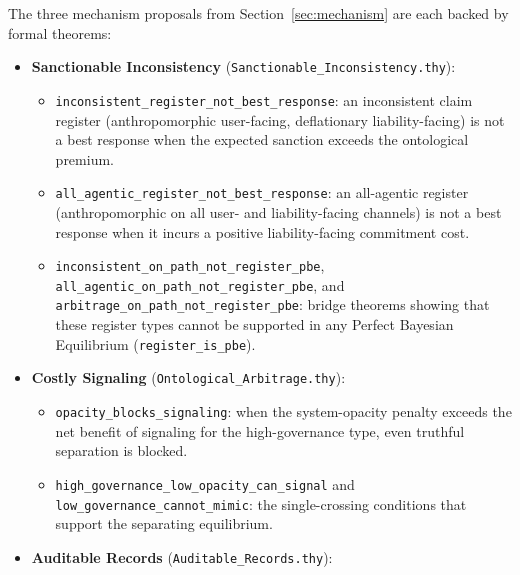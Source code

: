 The three mechanism proposals from Section~\ref{sec:mechanism} are each backed by formal theorems:
\begin{itemize}
    \item \textbf{Sanctionable Inconsistency} (\texttt{Sanctionable\_Inconsistency.thy}):
      \begin{itemize}
        \item \texttt{inconsistent\_\allowbreak{}register\_\allowbreak{}not\_\allowbreak{}best\_\allowbreak{}response}: an inconsistent claim register (anthropomorphic user-facing, deflationary liability-facing) is not a best response when the expected sanction exceeds the ontological premium.
        \item \texttt{all\_\allowbreak{}agentic\_\allowbreak{}register\_\allowbreak{}not\_\allowbreak{}best\_\allowbreak{}response}: an all-agentic register (anthropomorphic on all user- and liability-facing channels) is not a best response when it incurs a positive liability-facing commitment cost.
        \item \texttt{inconsistent\_\allowbreak{}on\_\allowbreak{}path\_\allowbreak{}not\_\allowbreak{}register\_\allowbreak{}pbe}, \texttt{all\_\allowbreak{}agentic\_\allowbreak{}on\_\allowbreak{}path\_\allowbreak{}not\_\allowbreak{}register\_\allowbreak{}pbe}, and \texttt{arbitrage\_\allowbreak{}on\_\allowbreak{}path\_\allowbreak{}not\_\allowbreak{}register\_\allowbreak{}pbe}: bridge theorems showing that these register types cannot be supported in any Perfect Bayesian Equilibrium (\texttt{register\_\allowbreak{}is\_\allowbreak{}pbe}).
      \end{itemize}
    \item \textbf{Costly Signaling} (\texttt{Ontological\_\allowbreak{}Arbitrage.thy}):
      \begin{itemize}
        \item \texttt{opacity\_\allowbreak{}blocks\_\allowbreak{}signaling}: when the system-opacity penalty exceeds the net benefit of signaling for the high-governance type, even truthful separation is blocked.
        \item \texttt{high\_\allowbreak{}governance\_\allowbreak{}low\_\allowbreak{}opacity\_\allowbreak{}can\_\allowbreak{}signal} and \texttt{low\_\allowbreak{}governance\_\allowbreak{}cannot\_\allowbreak{}mimic}: the single-crossing conditions that support the separating equilibrium.
      \end{itemize}
    \item \textbf{Auditable Records} (\texttt{Auditable\_Records.thy}):

\end{itemize}
